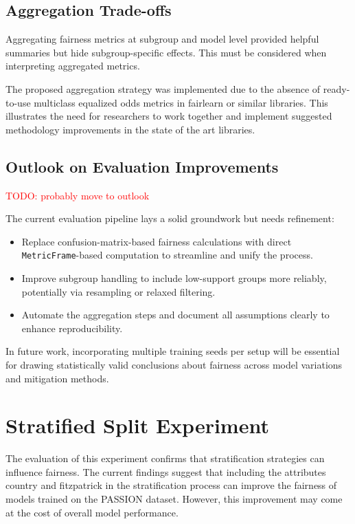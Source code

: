 \documentclass[12pt, a4paper, oneside]{book}   	%
\renewcommand{\todo}[1]{\textcolor{red}{TODO: #1}}
\begin{document}
		\subsection{Aggregation Trade-offs}
		Aggregating fairness metrics at subgroup and model level provided helpful summaries but hide subgroup-specific effects. This must be considered when interpreting aggregated metrics.
		
		The proposed aggregation strategy was implemented due to the absence of ready-to-use multiclass equalized odds metrics in fairlearn or similar libraries. This illustrates the need for researchers to work together and implement suggested methodology improvements in the state of the art libraries.
		
		\subsection{Outlook on Evaluation Improvements}
		\todo{probably move to outlook}
		
		The current evaluation pipeline lays a solid groundwork but needs refinement:
		\begin{itemize}
			\item Replace confusion-matrix-based fairness calculations with direct \texttt{MetricFrame}-based computation to streamline and unify the process.
			\item Improve subgroup handling to include low-support groups more reliably, potentially via resampling or relaxed filtering.
			\item Automate the aggregation steps and document all assumptions clearly to enhance reproducibility.
		\end{itemize}
		
		In future work, incorporating multiple training seeds per setup will be essential for drawing statistically valid conclusions about fairness across model variations and mitigation methods.
		
		\section{Stratified Split Experiment}
		
		The evaluation of this experiment confirms that stratification strategies can influence fairness. The current findings suggest that including the attributes country and fitzpatrick in the stratification process can improve the fairness of models trained on the PASSION dataset. However, this improvement may come at the cost of overall model performance.
		
\end{document}
